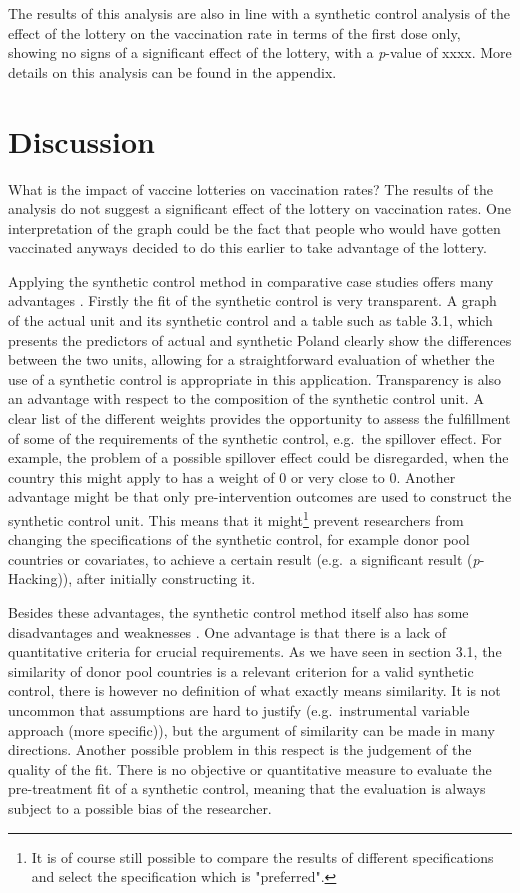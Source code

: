 \documentclass{scrbook}
\begin{document}
The results of this analysis are also in line with a synthetic control
analysis of the effect of the lottery on the vaccination rate in terms
of the first dose only, showing no signs of a significant effect of the
lottery, with a \textit{p}-value of xxxx. More details on this analysis
can be found in the appendix.

\chapter{Discussion}

What is the impact of vaccine lotteries on vaccination rates? The
results of the analysis do not suggest a significant effect of the
lottery on vaccination rates. One interpretation of the graph could be
the fact that people who would have gotten vaccinated anyways decided to
do this earlier to take advantage of the lottery.

Applying the synthetic control method in comparative case studies offers
many advantages \parencite{abadie_using_2021}. Firstly the fit of the
synthetic control is very transparent. A graph of the actual unit and
its synthetic control and a table such as table 3.1, which presents the
predictors of actual and synthetic Poland clearly show the differences
between the two units, allowing for a straightforward evaluation of
whether the use of a synthetic control is appropriate in this
application. Transparency is also an advantage with respect to the
composition of the synthetic control unit. A clear list of the different
weights provides the opportunity to assess the fulfillment of some of
the requirements of the synthetic control, e.g.~the spillover effect.
For example, the problem of a possible spillover effect could be
disregarded, when the country this might apply to has a weight of 0 or
very close to 0. Another advantage might be that only pre-intervention
outcomes are used to construct the synthetic control unit. This means
that it
might\footnote{It is of course still possible to compare the results of different specifications and select the specification which is "preferred".}
prevent researchers from changing the specifications of the synthetic
control, for example donor pool countries or covariates, to achieve a
certain result (e.g.~a significant result (\textit{p}-Hacking)), after
initially constructing it.

Besides these advantages, the synthetic control method itself also has
some disadvantages and weaknesses \parencite{bouttell_synthetic_2018}.
One advantage is that there is a lack of quantitative criteria for
crucial requirements. As we have seen in section 3.1, the similarity of
donor pool countries is a relevant criterion for a valid synthetic
control, there is however no definition of what exactly means
similarity. It is not uncommon that assumptions are hard to justify
(e.g.~instrumental variable approach (more specific)), but the argument
of similarity can be made in many directions. Another possible problem
in this respect is the judgement of the quality of the fit. There is no
objective or quantitative measure to evaluate the pre-treatment fit of a
synthetic control, meaning that the evaluation is always subject to a
possible bias of the researcher.
\end{document}
